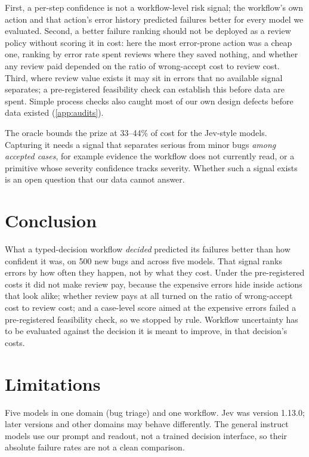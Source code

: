  First, a per-step confidence is not a
workflow-level risk signal; the workflow's own action and that action's
error history predicted failures better for every model we evaluated.
Second, a better failure ranking should not be deployed as a review policy
without scoring it in cost: here the most error-prone action was a cheap
one, ranking by error rate spent reviews where they saved nothing, and
whether any review paid depended on the ratio of wrong-accept cost to
review cost.
Third, where review value exists it may sit in errors that no available
signal separates; a pre-registered feasibility check can establish this
before data are spent. Simple process checks also caught most of our own
design defects before data existed (\cref{app:audits}).

 The oracle bounds the prize at 33--44\%
of cost for the Jev-style models. Capturing it needs a signal that
separates serious from minor bugs \emph{among accepted cases}, for example
evidence the workflow does not currently read, or a primitive whose
severity confidence tracks severity. Whether such a signal exists is an
open question that our data cannot answer.

\section{Conclusion}

What a typed-decision workflow \emph{decided} predicted its failures
better than how confident it was, on 500 new bugs and across five models.
That signal ranks errors by how often they happen, not by what they cost.
Under the pre-registered costs it did not make review pay, because the
expensive errors hide inside actions that look alike; whether review pays
at all turned on the ratio of wrong-accept cost to review cost; and a
case-level score aimed at the expensive errors failed a pre-registered
feasibility check, so we stopped by rule. Workflow uncertainty has to be
evaluated against the decision it is meant to improve, in that decision's
costs.

\section*{Limitations}

 Five models in one domain (bug triage) and one workflow. Jev
was version 1.13.0; later versions and other domains may behave
differently. The general instruct models use our prompt and readout, not a
trained decision interface, so their absolute failure rates are not a
clean comparison.

